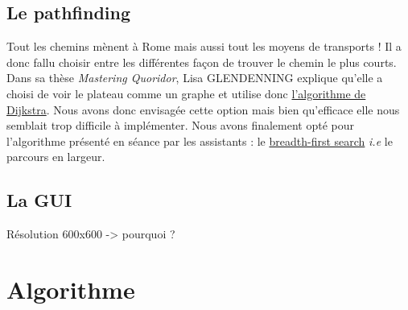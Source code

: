 \documentclass[a4paper, 12pt]{article}
\begin{document}
\subsection{Le pathfinding}
Tout les chemins mènent à Rome mais aussi tout les moyens de transports ! Il a donc fallu choisir entre les différentes façon de trouver le chemin le plus courts. \\
Dans sa thèse \textit{Mastering Quoridor}, Lisa GLENDENNING explique qu'elle a choisi de voir le plateau comme un graphe et utilise donc \href{https://en.wikipedia.org/wiki/Dijkstra_algorithm}{l'algorithme de Dijkstra}. Nous avons donc envisagée cette option mais bien qu'efficace elle nous semblait trop difficile à implémenter. Nous avons finalement opté pour l'algorithme présenté en séance par les assistants : le \href{https://en.wikipedia.org/wiki/Breadth-first_search}{breadth-first search} \textit{i.e} le parcours en largeur.

\subsection{La GUI}
Résolution 600x600 -> pourquoi ?

\section{Algorithme}
\end{document}
